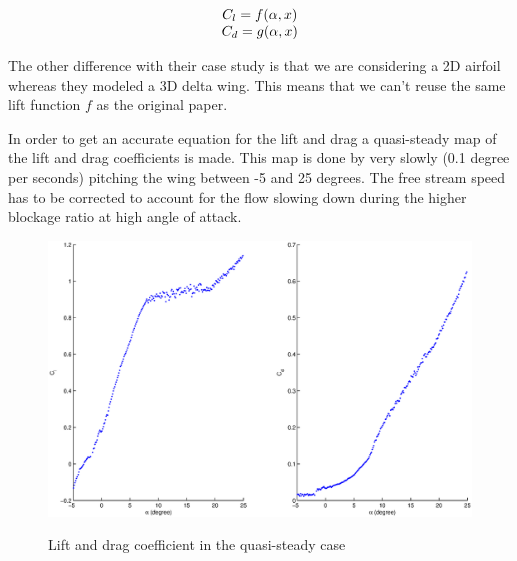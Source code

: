 \begin{equation}
	\begin{array}[c]{c}
		C_l=f(\alpha,x) \\
		C_d=g(\alpha,x)
	\end{array}
	\label{eqn:lift_drag_functions}
\end{equation}

\par The other difference with their case study is that we are considering a 2D airfoil whereas they modeled a 3D delta wing.
This means that we can't reuse the same lift function $f$ as the original paper.

\par In order to get an accurate equation for the lift and drag a quasi-steady map of the lift and drag coefficients is made.
This map is done by very slowly (0.1 degree per seconds) pitching the wing between -5 and 25 degrees.
The free stream speed has to be corrected to account for the flow slowing down during the higher blockage ratio at high angle of attack.

\begin{figure}[ht]
	\begin{center}
		\scalebox{0.5}
		{\includegraphics{../Figures/NACA0009_steady_map_Cl_Cd.eps}}
	\end{center}
	\caption{Lift and drag coefficient in the quasi-steady case}
	\label{fig:QS_Cl_Cd_vs_alpha}
\end{figure}

